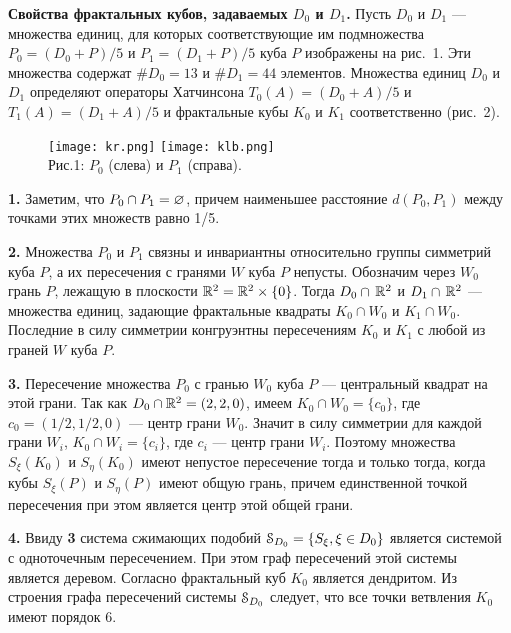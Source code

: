{\bf Свойства фрактальных кубов, задаваемых $ D_0$ и  $ D_1$.}
Пусть $ D_0$ и $ D_1$ --- множества единиц, для которых соответствующие им подмножества $P_0=( D_0+P)/5$  и $P_1=( D_1+P)/5$ куба $P$ изображены на рис.~1. 
Эти множества содержат $\# D_0=13$ и $\# D_1= 44$ элементов.
 Множества единиц $ D_0$ и $ D_1$ определяют операторы Хатчинсона $ T_0(A)=( D_0+A)/{5}$   и $T_1(A)=( D_1+A)/{5}$   и фрактальные кубы $K_0$ и $K_1$ соответственно (рис.~2).\smallskip

\begin{figure}[H]
\centering
\qquad\qquad\texttt{[image: kr.png]}
\hfill
\texttt{[image: klb.png]}\qquad\qquad\\
[2ex]
{\footnotesize Рис.1: $P_0$ (слева)  и $P_1$ (справа).}
\end{figure}


{\bf 1.} Заметим, что $P_0\cap P_1=\varnothing$, причем наименьшее расстояние $d(P_0,P_1)$ между точками этих множеств  равно 1/5.\smallskip

{\bf 2.} Множества $P_0$ и $P_1$ связны  и  инвариантны относительно группы симметрий куба $P$,  а их пересечения с гранями $W$ куба $P$ непусты. 
Обозначим через $W_0$   грань  $P$, лежащую в плоскости $\mathbb{R}^2=\mathbb{R}^2\times\{0\}$. 
Тогда $ D_0\cap\, \mathbb{R}^2$ и $ D_1\cap\, \mathbb{R}^2$ --- множества единиц, задающие фрактальные квадраты $K_0\cap W_0$ и $K_1\cap W_0$. 
Последние в силу симметрии конгруэнтны пересечениям $K_0$ и $K_1$ с любой из граней $W$ куба $P$.\smallskip

{\bf 3.} Пересечение множества $P_0$  с гранью $W_0$ куба $P$ --- центральный квадрат  на этой грани. 
Так как $ D_0\cap \mathbb{R}^2=(2,2,0)$,  имеем $K_0\cap W_0=\{c_0\} $, где $c_0=(1/2,1/2,0)$ --- центр грани $W_0$. 
Значит в силу симметрии для каждой грани $W_i$,  $K_0\cap W_i=\{c_i\} $, где $c_i$ --- центр грани $W_i$. 
Поэтому множества $S_\xi(K_0)$ и $S_\eta(K_0)$ имеют непустое пересечение тогда и только тогда, когда кубы  $S_\xi(P)$ и $S_\eta(P)$ имеют общую грань, причем   единственной точкой пересечения при этом является центр этой общей грани.\smallskip

{\bf 4.} Ввиду {\bf 3} система сжимающих подобий ${\EuScript S}_{ D_0}=\{S_\xi,\xi\in  D_0\}$ является системой с одноточечным пересечением. 
При этом  граф пересечений этой системы является деревом. 
Согласно \cite[Theorem 1.7]{FIP} фрактальный куб $K_0$ является дендритом.
Из строения графа пересечений системы ${\EuScript S}_{ D_0}$ следует, что  все точки ветвления $K_0$ имеют порядок 6.\smallskip

